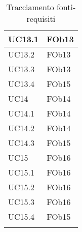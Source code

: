 \begin{longtable}{|l|p{4cm}|}
\hline
		UC13.1 & FOb13 \linebreak   \\
\hline
		UC13.2 & FOb13 \linebreak   \\
\hline
		UC13.3 & FOb13 \linebreak   \\
\hline
		UC13.4 & FOb15 \linebreak   \\
\hline
		UC14 & FOb14 \linebreak   \\
\hline
		UC14.1 & FOb14 \linebreak   \\
\hline
		UC14.2 & FOb14 \linebreak   \\
\hline
		UC14.3 & FOb15 \linebreak   \\
\hline
		UC15 & FOb16 \linebreak   \\
\hline
		UC15.1 & FOb16 \linebreak   \\
\hline
		UC15.2 & FOb16 \linebreak   \\
\hline
		UC15.3 & FOb16 \linebreak   \\
\hline
		UC15.4 & FOb15 \linebreak   \\
\hline
\caption{Tracciamento fonti-requisiti}
\end{longtable}